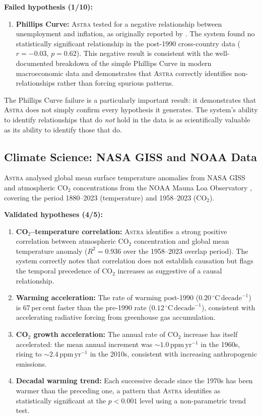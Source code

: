 \documentclass[fleqn,usenatbib]{mnras}
\newcommand{\astra}{\textsc{Astra}\xspace}
\begin{document}
\textbf{Failed hypothesis (1/10):}
\begin{enumerate}
  \item[(x)] \textbf{Phillips Curve:} \astra tested for a negative relationship between unemployment and inflation, as originally reported by \citet{Phillips1958}. The system found no statistically significant relationship in the post-1990 cross-country data ($r = -0.03$, $p = 0.62$). This negative result is consistent with the well-documented breakdown of the simple Phillips Curve in modern macroeconomic data and demonstrates that \astra correctly identifies non-relationships rather than forcing spurious patterns.
\end{enumerate}

The Phillips Curve failure is a particularly important result: it demonstrates that \astra does not simply confirm every hypothesis it generates. The system's ability to identify relationships that do \emph{not} hold in the data is as scientifically valuable as its ability to identify those that do.

\subsection{Climate Science: NASA GISS and NOAA Data}
\label{sec:crossdomain:climate}

\astra analysed global mean surface temperature anomalies from NASA GISS \citep{Hansen2010} and atmospheric CO$_{2}$ concentrations from the NOAA Mauna Loa Observatory \citep{NOAA2024}, covering the period 1880--2023 (temperature) and 1958--2023 (CO$_{2}$).

\textbf{Validated hypotheses (4/5):}
\begin{enumerate}
  \item[(i)] \textbf{CO$_{2}$--temperature correlation:} \astra identifies a strong positive correlation between atmospheric CO$_{2}$ concentration and global mean temperature anomaly ($R^{2} = 0.936$ over the 1958--2023 overlap period). The system correctly notes that correlation does not establish causation but flags the temporal precedence of CO$_{2}$ increases as suggestive of a causal relationship.
  \item[(ii)] \textbf{Warming acceleration:} The rate of warming post-1990 ($0.20\,^{\circ}\mathrm{C}\,\mathrm{decade}^{-1}$) is 67\,per\,cent faster than the pre-1990 rate ($0.12\,^{\circ}\mathrm{C}\,\mathrm{decade}^{-1}$), consistent with accelerating radiative forcing from greenhouse gas accumulation.
  \item[(iii)] \textbf{CO$_{2}$ growth acceleration:} The annual rate of CO$_{2}$ increase has itself accelerated: the mean annual increment was ${\sim}1.0$\,ppm\,yr$^{-1}$ in the 1960s, rising to ${\sim}2.4$\,ppm\,yr$^{-1}$ in the 2010s, consistent with increasing anthropogenic emissions.
  \item[(iv)] \textbf{Decadal warming trend:} Each successive decade since the 1970s has been warmer than the preceding one, a pattern that \astra identifies as statistically significant at the $p < 0.001$ level using a non-parametric trend test.
\end{enumerate}
\end{document}
